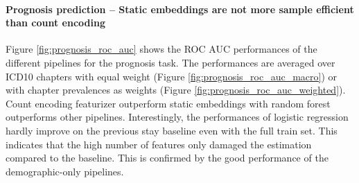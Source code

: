\documentclass[french,12pt,twoside,a4paper]{book}
\begin{document}
\paragraph{Prognosis prediction -- Static embeddings are not more sample efficient
  than count encoding}%

Figure \ref{fig:prognosis_roc_auc} shows the ROC AUC performances of the
different pipelines for the prognosis task. The performances are averaged over
ICD10 chapters with equal weight (Figure \ref{fig:prognosis_roc_auc_macro}) or
with chapter prevalences as weights (Figure \ref{fig:prognosis_roc_auc_weighted}).
Count encoding featurizer outperform static embeddings with random forest
outperforms other pipelines. Interestingly, the performances of logistic
regression hardly improve on the previous stay baseline even with the full train
set. This indicates that the high number of features only damaged the estimation
compared to the baseline. This is confirmed by the good performance of the
demographic-only pipelines.
\end{document}
